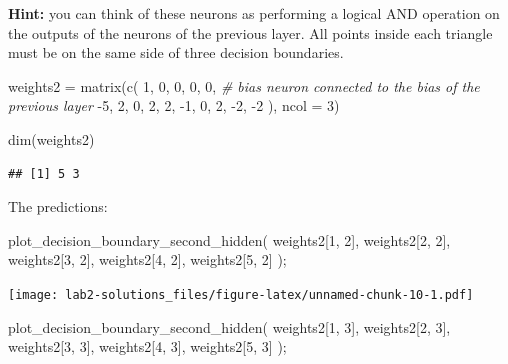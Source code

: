 \documentclass[
]{article}
\newenvironment{Shaded}{\begin{snugshade}}{\end{snugshade}}
\newcommand{\AttributeTok}[1]{\textcolor[rgb]{0.77,0.63,0.00}{#1}}
\newcommand{\CommentTok}[1]{\textcolor[rgb]{0.56,0.35,0.01}{\textit{#1}}}
\newcommand{\DecValTok}[1]{\textcolor[rgb]{0.00,0.00,0.81}{#1}}
\newcommand{\FunctionTok}[1]{\textcolor[rgb]{0.00,0.00,0.00}{#1}}
\newcommand{\NormalTok}[1]{#1}
\newcommand{\OtherTok}[1]{\textcolor[rgb]{0.56,0.35,0.01}{#1}}
\newcommand{\SpecialCharTok}[1]{\textcolor[rgb]{0.00,0.00,0.00}{#1}}
\begin{document}
\textbf{Hint:} you can think of these neurons as performing a logical
AND operation on the outputs of the neurons of the previous layer. All
points inside each triangle must be on the same side of three decision
boundaries.

\begin{Shaded}
\begin{Highlighting}[]
\NormalTok{weights2 }\OtherTok{=} \FunctionTok{matrix}\NormalTok{(}\FunctionTok{c}\NormalTok{(}
  \DecValTok{1}\NormalTok{, }\DecValTok{0}\NormalTok{, }\DecValTok{0}\NormalTok{, }\DecValTok{0}\NormalTok{, }\DecValTok{0}\NormalTok{,  }\CommentTok{\# bias neuron connected to the bias of the previous layer}
  \SpecialCharTok{{-}}\DecValTok{5}\NormalTok{, }\DecValTok{2}\NormalTok{, }\DecValTok{0}\NormalTok{, }\DecValTok{2}\NormalTok{, }\DecValTok{2}\NormalTok{,}
  \SpecialCharTok{{-}}\DecValTok{1}\NormalTok{, }\DecValTok{0}\NormalTok{, }\DecValTok{2}\NormalTok{, }\SpecialCharTok{{-}}\DecValTok{2}\NormalTok{, }\SpecialCharTok{{-}}\DecValTok{2}
\NormalTok{), }\AttributeTok{ncol =} \DecValTok{3}\NormalTok{)}

\FunctionTok{dim}\NormalTok{(weights2)}
\end{Highlighting}
\end{Shaded}

\begin{verbatim}
## [1] 5 3
\end{verbatim}

The predictions:

\begin{Shaded}
\begin{Highlighting}[]
\FunctionTok{plot\_decision\_boundary\_second\_hidden}\NormalTok{(}
\NormalTok{  weights2[}\DecValTok{1}\NormalTok{, }\DecValTok{2}\NormalTok{], weights2[}\DecValTok{2}\NormalTok{, }\DecValTok{2}\NormalTok{], weights2[}\DecValTok{3}\NormalTok{, }\DecValTok{2}\NormalTok{], weights2[}\DecValTok{4}\NormalTok{, }\DecValTok{2}\NormalTok{], weights2[}\DecValTok{5}\NormalTok{, }\DecValTok{2}\NormalTok{]}
\NormalTok{);}
\end{Highlighting}
\end{Shaded}

\texttt{[image: lab2-solutions\_files/figure-latex/unnamed-chunk-10-1.pdf]}

\begin{Shaded}
\begin{Highlighting}[]
\FunctionTok{plot\_decision\_boundary\_second\_hidden}\NormalTok{(}
\NormalTok{  weights2[}\DecValTok{1}\NormalTok{, }\DecValTok{3}\NormalTok{], weights2[}\DecValTok{2}\NormalTok{, }\DecValTok{3}\NormalTok{], weights2[}\DecValTok{3}\NormalTok{, }\DecValTok{3}\NormalTok{], weights2[}\DecValTok{4}\NormalTok{, }\DecValTok{3}\NormalTok{], weights2[}\DecValTok{5}\NormalTok{, }\DecValTok{3}\NormalTok{]}
\NormalTok{);}
\end{Highlighting}
\end{Shaded}
\end{document}
